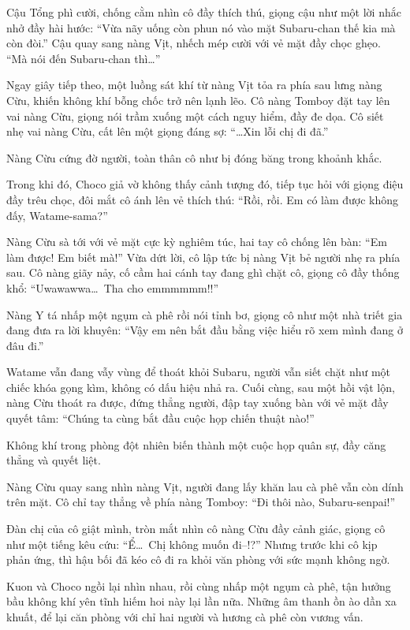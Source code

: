\documentclass[../main.tex]{subfiles}
\begin{document}
Cậu Tổng phì cười, chống cằm nhìn cô đầy thích thú, giọng cậu như một lời nhắc nhở đầy hài hước: ``Vừa nãy uống còn phun nó vào mặt Subaru-chan thế kia mà còn đòi.'' Cậu quay sang nàng Vịt, nhếch mép cười với vẻ mặt đầy chọc ghẹo. ``Mà nói đến Subaru-chan thì\dots''

Ngay giây tiếp theo, một luồng sát khí từ nàng Vịt tỏa ra phía sau lưng nàng Cừu, khiến không khí bỗng chốc trở nên lạnh lẽo. Cô nàng Tomboy đặt tay lên vai nàng Cừu, giọng nói trầm xuống một cách nguy hiểm, đầy đe dọa. Cô siết nhẹ vai nàng Cừu, cất lên một giọng đáng sợ: ``\dots Xin lỗi chị đi đã.''


Nàng Cừu cứng đờ người, toàn thân cô như bị đóng băng trong khoảnh khắc.

Trong khi đó, Choco giả vờ không thấy cảnh tượng đó, tiếp tục hỏi với giọng điệu đầy trêu chọc, đôi mắt cô ánh lên vẻ thích thú: ``Rồi, rồi. Em có làm được không đấy, Watame-sama?''

Nàng Cừu sà tới với vẻ mặt cực kỳ nghiêm túc, hai tay cô chống lên bàn: ``Em làm được! Em biết mà!'' Vừa dứt lời, cô lập tức bị nàng Vịt bẻ người nhẹ ra phía sau. Cô nàng giãy nảy, cố cầm hai cánh tay đang ghì chặt cô, giọng cô đầy thống khổ: ``Uwawawwa\dots\ Tha cho emmmmmm!!''

Nàng Y tá nhấp một ngụm cà phê rồi nói tỉnh bơ, giọng cô như một nhà triết gia đang đưa ra lời khuyên: ``Vậy em nên bắt đầu bằng việc hiểu rõ xem mình đang ở đâu đi.''


Watame vẫn đang vẫy vùng để thoát khỏi Subaru, người vẫn siết chặt như một chiếc khóa gọng kìm, không có dấu hiệu nhả ra. Cuối cùng, sau một hồi vật lộn, nàng Cừu thoát ra được, đứng thẳng người, đập tay xuống bàn với vẻ mặt đầy quyết tâm: ``Chúng ta cùng bắt đầu cuộc họp chiến thuật nào!''

Không khí trong phòng đột nhiên biến thành một cuộc họp quân sự, đầy căng thẳng và quyết liệt.

Nàng Cừu quay sang nhìn nàng Vịt, người đang lấy khăn lau cà phê vẫn còn dính trên mặt. Cô chỉ tay thẳng về phía nàng Tomboy: ``Đi thôi nào, Subaru-senpai!''

Đàn chị của cô giật mình, tròn mắt nhìn cô nàng Cừu đầy cảnh giác, giọng cô như một tiếng kêu cứu: ``Ể\dots\ Chị không muốn đi--!?'' Nhưng trước khi cô kịp phản ứng, thì hậu bối đã kéo cô đi ra khỏi văn phòng với sức mạnh không ngờ.

Kuon và Choco ngồi lại nhìn nhau, rồi cùng nhấp một ngụm cà phê, tận hưởng bầu không khí yên tĩnh hiếm hoi này lại lần nữa. Những âm thanh ồn ào dần xa khuất, để lại căn phòng với chỉ hai người và hương cà phê còn vương vấn.
\end{document}
